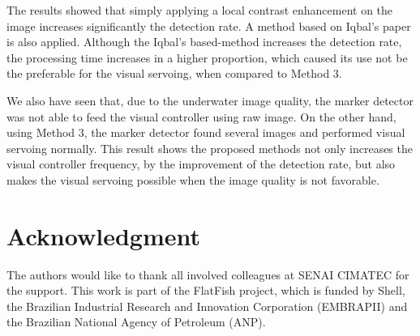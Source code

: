\documentclass[conference, letterpaper]{IEEEtran}
\begin{document}
The results showed that simply applying a local contrast enhancement on the
image increases significantly the detection rate. A method based on Iqbal's
paper is also applied. Although the Iqbal's based-method increases the
detection rate, the processing time increases in a higher proportion, which
caused its use not be the preferable for the visual servoing, when compared to
Method 3.

We also have seen that, due to the underwater image quality, the marker
detector was not able to feed the visual controller using raw image. On the
other hand, using Method 3, the marker detector found several images and
performed visual servoing normally. This result shows the proposed methods not
only increases the visual controller frequency, by the improvement of the
detection rate, but also makes the visual servoing possible when the image
quality is not favorable.

\section*{Acknowledgment}

The authors would like to thank all involved colleagues at SENAI CIMATEC for
the support. This work is part of the FlatFish project, which is funded by
Shell, the Brazilian Industrial Research and Innovation Corporation (EMBRAPII)
and the Brazilian National Agency of Petroleum (ANP).






\end{document}

